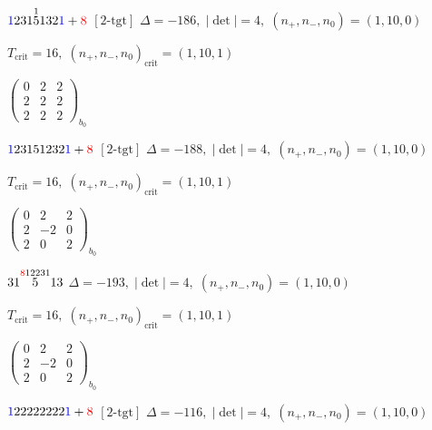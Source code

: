 \documentclass[10pt]{article}
\begin{document}
\smallskip

$\textcolor{blue}{1}231\overset{1}{5}132\textcolor{blue}{1}+\textcolor{red}{8}$ $\scriptstyle [2\text{-tgt}]$ \quad $\Delta=-186,\; |\det|=4,\; (n_+,n_-,n_0)=(1,10,0)$

\hspace{1em}$T_{\text{crit}}=16,\; (n_+,n_-,n_0)_{\text{crit}}=(1,10,1)$

\hspace{2em}$\left(\begin{smallmatrix}0 & 2 & 2 \\ 2 & 2 & 2 \\ 2 & 2 & 2\end{smallmatrix}\right)_{\!b_0}$

\smallskip

$\textcolor{blue}{1}23151232\textcolor{blue}{1}+\textcolor{red}{8}$ $\scriptstyle [2\text{-tgt}]$ \quad $\Delta=-188,\; |\det|=4,\; (n_+,n_-,n_0)=(1,10,0)$

\hspace{1em}$T_{\text{crit}}=16,\; (n_+,n_-,n_0)_{\text{crit}}=(1,10,1)$

\hspace{2em}$\left(\begin{smallmatrix}0 & 2 & 2 \\ 2 & -2 & 0 \\ 2 & 0 & 2\end{smallmatrix}\right)_{\!b_0}$

\smallskip

$31\overset{\textcolor{red}{8}12231}{5}13$ \quad $\Delta=-193,\; |\det|=4,\; (n_+,n_-,n_0)=(1,10,0)$

\hspace{1em}$T_{\text{crit}}=16,\; (n_+,n_-,n_0)_{\text{crit}}=(1,10,1)$

\hspace{2em}$\left(\begin{smallmatrix}0 & 2 & 2 \\ 2 & -2 & 0 \\ 2 & 0 & 2\end{smallmatrix}\right)_{\!b_0}$

\smallskip

$\textcolor{blue}{1}22222222\textcolor{blue}{1}+\textcolor{red}{8}$ $\scriptstyle [2\text{-tgt}]$ \quad $\Delta=-116,\; |\det|=4,\; (n_+,n_-,n_0)=(1,10,0)$
\end{document}
